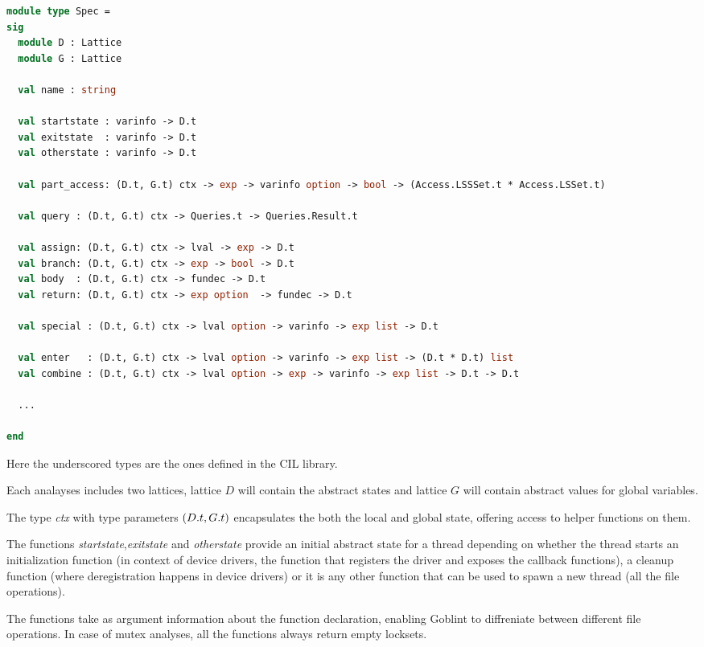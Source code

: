 \documentclass[..thesis.tex]{subfiles}
\begin{document}
\begin{lstlisting}[language=Caml,style=caml]
module type Spec =
sig
  module D : Lattice
  module G : Lattice

  val name : string

  val startstate : varinfo -> D.t
  val exitstate  : varinfo -> D.t
  val otherstate : varinfo -> D.t

  val part_access: (D.t, G.t) ctx -> exp -> varinfo option -> bool -> (Access.LSSSet.t * Access.LSSet.t)

  val query : (D.t, G.t) ctx -> Queries.t -> Queries.Result.t

  val assign: (D.t, G.t) ctx -> lval -> exp -> D.t
  val branch: (D.t, G.t) ctx -> exp -> bool -> D.t
  val body  : (D.t, G.t) ctx -> fundec -> D.t
  val return: (D.t, G.t) ctx -> exp option  -> fundec -> D.t

  val special : (D.t, G.t) ctx -> lval option -> varinfo -> exp list -> D.t

  val enter   : (D.t, G.t) ctx -> lval option -> varinfo -> exp list -> (D.t * D.t) list
  val combine : (D.t, G.t) ctx -> lval option -> exp -> varinfo -> exp list -> D.t -> D.t

  ...

end
\end{lstlisting}

Here the underscored types are the ones defined in the CIL library.

Each analayses includes two lattices, lattice $D$ will contain the abstract states and lattice $G$ will contain abstract values for global variables.

The type \textit{ctx} with type parameters $\left( D.t, G.t \right)$ encapsulates the both the local and global state, offering access to helper functions on them. 

The functions \textit{startstate},\textit{exitstate} and \textit{otherstate} provide an initial abstract state for a thread depending on whether the thread starts an
initialization function (in context of device drivers, the function that registers the driver and exposes the callback functions),
a cleanup function (where deregistration happens in device drivers) or it is any other function that can be used to spawn a new thread (all the file operations).

The functions take as argument information about the function declaration, enabling Goblint to diffreniate between different file operations.
In case of mutex analyses, all the functions always return empty locksets.
\end{document}
